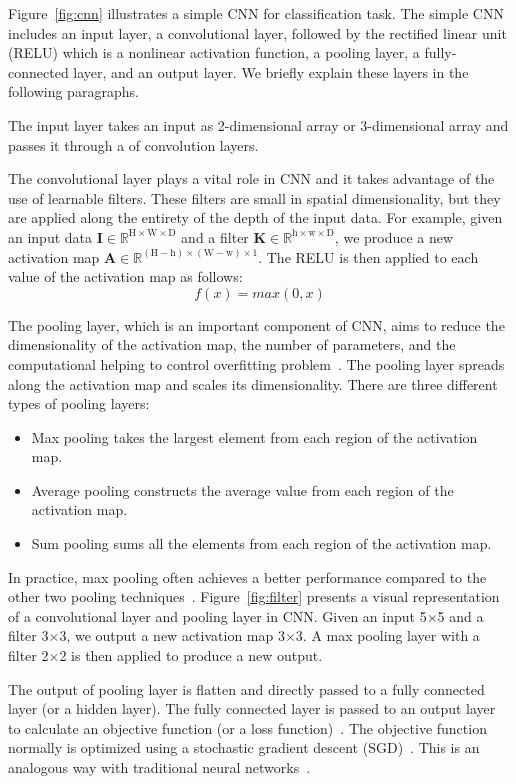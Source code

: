 Figure~\ref{fig:cnn} illustrates a simple CNN for classification task. The simple CNN includes an input layer, a convolutional layer, followed by the rectified linear unit (RELU) which is a nonlinear activation function, a pooling layer, a fully-connected layer, and an output layer. We briefly explain these layers in the following paragraphs. 

The input layer takes an input as 2-dimensional array or 3-dimensional array and passes it through a of convolution layers.

The convolutional layer plays a vital role in CNN and it takes advantage of the use of learnable filters. These filters are small in spatial dimensionality, but they are applied along the entirety of the depth of the input data. For example, given an input data $\textbf{I} \in \mathbb{R}^{\text{H} \times \text{W} \times \text{D}}$ and a filter $\textbf{K} \in \mathbb{R}^{\text{h} \times \text{w} \times \text{D}}$, we produce a new activation map $\textbf{A} \in \mathbb{R}^{(\text{H} - \text{h}) \times (\text{W} - \text{w}) \times 1}$. The RELU is then applied to each value of the activation map as follows:
\begin{equation}
\label{eq:relu}
f(x) = max(0, x)   
\end{equation}

The pooling layer, which is an important component of CNN, aims to reduce the dimensionality of the activation map, the number of parameters, and the computational helping to control overfitting problem~\cite{tolias2015particular}. The pooling layer spreads along the activation map and scales its dimensionality. There are three different types of pooling layers:
\begin{itemize}
	\item Max pooling takes the largest element from each region of the activation map.
	\item Average pooling constructs the average value from each region of the activation map.
	\item Sum pooling sums all the elements from each region of the activation map. 
\end{itemize}
In practice, max pooling often achieves a better performance compared to the other two pooling techniques~\cite{zeiler2013stochastic}. Figure~\ref{fig:filter} presents a visual representation of a convolutional layer and pooling layer in CNN. Given an input 5$\times$5 and a filter 3$\times$3, we output a new activation map 3$\times$3. A max pooling layer with a filter 2$\times$2 is then applied to produce a new output. 

The output of pooling layer is flatten and directly passed to a fully connected layer (or a hidden layer). The fully connected layer is passed to an output layer to calculate an objective function (or a loss function)~\cite{zhao2017loss}. The objective function normally is optimized using a stochastic gradient descent (SGD)~\cite{bottou2010large}. This is an analogous way with traditional neural networks~\cite{huang1988neural}.



